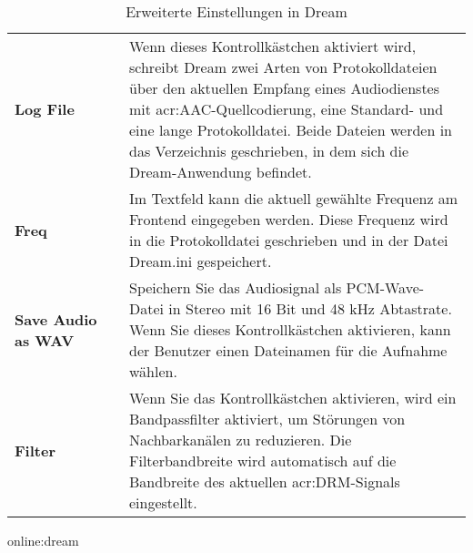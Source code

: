 \begin{table}[htb]
\begin{center}
\begin{tabular}{p{0.25\linewidth} p{0.75\linewidth}}
			\textbf{Log File} & Wenn dieses Kontrollkästchen aktiviert wird, schreibt Dream zwei Arten von Protokolldateien über den aktuellen Empfang eines Audiodienstes mit \gls{acr:AAC}-Quellcodierung, eine Standard- und eine lange Protokolldatei. Beide Dateien werden in das Verzeichnis geschrieben, in dem sich die Dream-Anwendung befindet.\\
			
			\textbf{Freq} & Im Textfeld kann die aktuell gewählte Frequenz am Frontend eingegeben werden. Diese Frequenz wird in die Protokolldatei geschrieben und in der Datei Dream.ini gespeichert.
			\\
			
			\textbf{Save Audio as WAV} & Speichern Sie das Audiosignal als PCM-Wave-Datei in Stereo mit 16 Bit und 48 kHz Abtastrate. Wenn Sie dieses Kontrollkästchen aktivieren, kann der Benutzer einen Dateinamen für die Aufnahme wählen. \\
			
			\textbf{Filter}& Wenn Sie das Kontrollkästchen aktivieren, wird ein Bandpassfilter aktiviert, um Störungen von Nachbarkanälen zu reduzieren. Die Filterbandbreite wird automatisch auf die Bandbreite des aktuellen \gls{acr:DRM}-Signals eingestellt.\\
			\bottomrule
		\end{tabular}
		\caption{Erweiterte Einstellungen in Dream}\gls{online:dream}
		\label{tab:advdream}
	\end{center}
\end{table}

